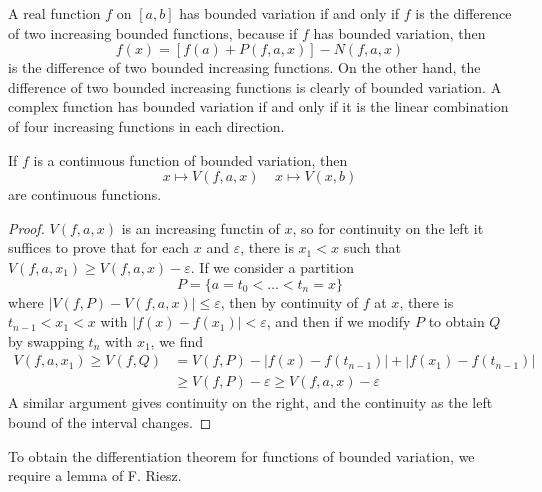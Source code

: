 A real function $f$ on $[a,b]$ has bounded variation if and only if $f$ is the difference of two increasing bounded functions, because if $f$ has bounded variation, then
%
\[ f(x) = [f(a) + P(f,a,x)] - N(f,a,x) \]
%
is the difference of two bounded increasing functions. On the other hand, the difference of two bounded increasing functions is clearly of bounded variation. A complex function has bounded variation if and only if it is the linear combination of four increasing functions in each direction.

\begin{theorem}
    If $f$ is a continuous function of bounded variation, then
    \[ x \mapsto V(f,a,x) \ \ \ \ \ x \mapsto V(x,b) \]
    are continuous functions.
\end{theorem}
\begin{proof}
    $V(f,a,x)$ is an increasing functin of $x$, so for continuity on the left it suffices to prove that for each $x$ and $\varepsilon$, there is $x_1 < x$ such that $V(f,a,x_1) \geq V(f,a,x) - \varepsilon$. If we consider a partition
    \[ P = \{ a = t_0 <  \dots < t_n = x \} \]
    where $|V(f,P) - V(f,a,x)| \leq \varepsilon$, then by continuity of $f$ at $x$, there is $t_{n-1} < x_1 < x$ with $|f(x) - f(x_1)| < \varepsilon$, and then if we modify $P$ to obtain $Q$ by swapping $t_n$ with $x_1$, we find
    \begin{align*}
        V(f,a,x_1) \geq V(f,Q) &= V(f,P) - |f(x) - f(t_{n-1})| + |f(x_1) - f(t_{n-1})|\\
        &\geq V(f,P) - \varepsilon \geq V(f,a,x) - \varepsilon
    \end{align*}
    A similar argument gives continuity on the right, and the continuity as the left bound of the interval changes.
\end{proof}

To obtain the differentiation theorem for functions of bounded variation, we require a lemma of F. Riesz.

